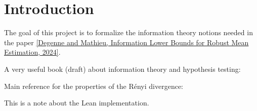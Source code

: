 \chapter*{Introduction}

The goal of this project is to formalize the information theory notions needed in the paper \href{https://arxiv.org/abs/2403.01892}{[Degenne and Mathieu, Information Lower Bounds for Robust Mean Estimation, 2024]}.

A very useful book (draft) about information theory and hypothesis testing: \cite{polyanskiy2024information} 

Main reference for the properties of the Rényi divergence: \cite{van2014renyi}

\begin{tcolorbox}
This is a note about the Lean implementation.
\end{tcolorbox}